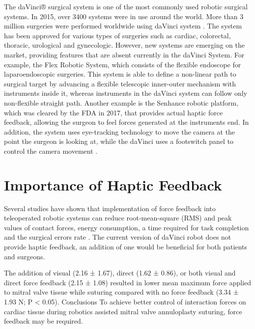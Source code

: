 The daVinci® surgical system is one of the most commonly used robotic surgical systems. In 2015, over 3400 systems were in use around the world. More than 3 million surgeries were performed worldwide using daVinci system \cite{_intuitive_2018}. The system has been approved for various types of surgeries such as cardiac, colorectal, thoracic, urological and gynecologic. However, new systems are emerging on the market, providing features that are absent currently in the daVinci System. For example, the Flex Robotic System, which consists of the flexible endoscope for laparoendoscopic surgeries. This system is able to define a non-linear path to surgical target by advancing a flexible telescopic inner-outer mechanism with instruments inside it, whereas instruments in the daVinci system can follow only non-flexible straight path. Another example is the Senhance robotic platform, which was cleared by the FDA in 2017, that provides actual haptic force feedback, allowing the surgeon to feel forces generated at the instruments end. In addition, the system uses eye-tracking technology to move the camera at the point the surgeon is looking at, while the daVinci uses a footswitch panel to control the camera movement \cite{peters_review_2018}.



\section{Importance of Haptic Feedback}
\label{sec:hapticFeedbackImportance}

Several studies \cite{lim_role_2015, alleblas_effects_2017, currie_role_2017} have shown that implementation of force feedback into teleoperated robotic systems can reduce root-mean-square (RMS) and peak values of contact forces, energy consumption, a time required for task completion and the surgical errors rate \cite{tavakoli_haptics_2008}. The current version of daVinci robot does not provide haptic feedback, an addition of one would be beneficial for both patients and surgeons.

The addition of visual (2.16 ± 1.67), direct (1.62 ± 0.86), or both visual and direct force
feedback (2.15 ± 1.08) resulted in lower mean maximum force applied to mitral valve tissue while
suturing compared with no force feedback (3.34 ± 1.93 N; P < 0.05).
Conclusions To achieve better control of interaction forces on cardiac tissue during robotics assisted
mitral valve annuloplasty suturing, force feedback may be required. \cite{currie_role_2017}

